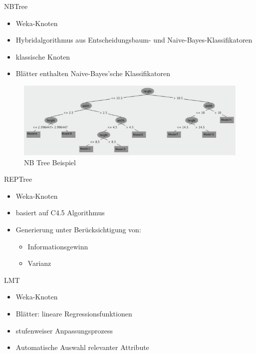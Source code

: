 \documentclass[
	handout,
  	aspectratio=169
]{beamer}
\begin{document}
		\begin{frame}{NBTree}
			\begin{itemize}
				\item Weka-Knoten
				\item Hybridalgorithmus aus Entscheidungsbaum- und Naive-Bayes-Klassifikatoren
				\item \glqq{}klassische\grqq{} Knoten
				\item Blätter enthalten Naive-Bayes’sche Klassifikatoren
			\end{itemize}	
			
			\begin{center}
				\begin{figure}[h]
					\includegraphics[scale=1]{../pictures/NBTree-classifying-MAC-Felinae.jpg}
					\caption{NB Tree Beispiel}		
				\end{figure}		
			\end{center}			
		\end{frame}

		\begin{frame}{REPTree}	
			\begin{itemize}
				\item Weka-Knoten
				\item basiert auf C4.5 Algorithmus
				\item Generierung unter Berücksichtigung von:
				\begin{itemize}
					\item Informationsgewinn
					\item Varianz
				\end{itemize}
			\end{itemize}	
		\end{frame}

		\begin{frame}{LMT}	
			\begin{itemize}
				\item Weka-Knoten
				\item Blätter: lineare Regressionsfunktionen
				\item stufenweiser Anpassungsprozess
				\item Automatische Auswahl relevanter Attribute
			\end{itemize}		
		\end{frame}
\end{document}
